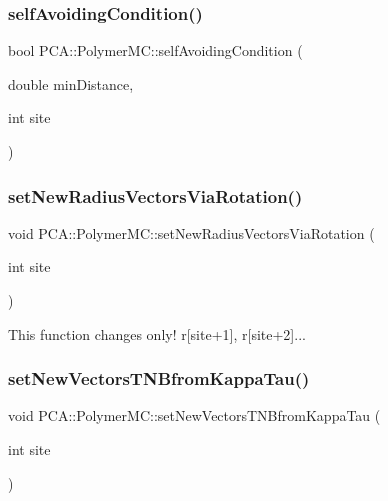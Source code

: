 \subsubsection{\texorpdfstring{self\+Avoiding\+Condition()}{selfAvoidingCondition()}}
{\footnotesize\ttfamily bool P\+C\+A\+::\+Polymer\+M\+C\+::self\+Avoiding\+Condition (\begin{DoxyParamCaption}\item[{double}]{min\+Distance,  }\item[{int}]{site }\end{DoxyParamCaption})}

\hypertarget{class_p_c_a_1_1_polymer_m_c_a80c92a94292d085a0d0ce0563ae0a1fd}{}\label{class_p_c_a_1_1_polymer_m_c_a80c92a94292d085a0d0ce0563ae0a1fd} 
\subsubsection{\texorpdfstring{set\+New\+Radius\+Vectors\+Via\+Rotation()}{setNewRadiusVectorsViaRotation()}}
{\footnotesize\ttfamily void P\+C\+A\+::\+Polymer\+M\+C\+::set\+New\+Radius\+Vectors\+Via\+Rotation (\begin{DoxyParamCaption}\item[{int}]{site }\end{DoxyParamCaption})}



This function changes only! r\mbox{[}site+1\mbox{]}, r\mbox{[}site+2\mbox{]}... 

\hypertarget{class_p_c_a_1_1_polymer_m_c_ab7ec6ffe521bf27c218f4a6eac6c394b}{}\label{class_p_c_a_1_1_polymer_m_c_ab7ec6ffe521bf27c218f4a6eac6c394b} 
\subsubsection{\texorpdfstring{set\+New\+Vectors\+T\+N\+Bfrom\+Kappa\+Tau()}{setNewVectorsTNBfromKappaTau()}}
{\footnotesize\ttfamily void P\+C\+A\+::\+Polymer\+M\+C\+::set\+New\+Vectors\+T\+N\+Bfrom\+Kappa\+Tau (\begin{DoxyParamCaption}\item[{int}]{site }\end{DoxyParamCaption})}



